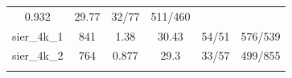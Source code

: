 \documentclass[]{article}
\begin{document}
\begin{longtable}[]{@{}cccccc@{}}
\begin{minipage}[t]{0.11\columnwidth}
0.932\strut
\end{minipage} & \begin{minipage}[t]{0.13\columnwidth}\centering\strut
29.77\strut
\end{minipage} & \begin{minipage}[t]{0.18\columnwidth}\centering\strut
32/77\strut
\end{minipage} & \begin{minipage}[t]{0.22\columnwidth}\centering\strut
511/460\strut
\end{minipage}\tabularnewline
\begin{minipage}[t]{0.11\columnwidth}\centering\strut
sier\_4k\_1\strut
\end{minipage} & \begin{minipage}[t]{0.07\columnwidth}\centering\strut
841\strut
\end{minipage} & \begin{minipage}[t]{0.11\columnwidth}\centering\strut
1.38\strut
\end{minipage} & \begin{minipage}[t]{0.13\columnwidth}\centering\strut
30.43\strut
\end{minipage} & \begin{minipage}[t]{0.18\columnwidth}\centering\strut
54/51\strut
\end{minipage} & \begin{minipage}[t]{0.22\columnwidth}\centering\strut
576/539\strut
\end{minipage}\tabularnewline
\begin{minipage}[t]{0.11\columnwidth}\centering\strut
sier\_4k\_2\strut
\end{minipage} & \begin{minipage}[t]{0.07\columnwidth}\centering\strut
764\strut
\end{minipage} & \begin{minipage}[t]{0.11\columnwidth}\centering\strut
0.877\strut
\end{minipage} & \begin{minipage}[t]{0.13\columnwidth}\centering\strut
29.3\strut
\end{minipage} & \begin{minipage}[t]{0.18\columnwidth}\centering\strut
33/57\strut
\end{minipage} & \begin{minipage}[t]{0.22\columnwidth}\centering\strut
499/855\strut
\end{minipage}\tabularnewline
\begin{minipage}[t]{0.11\columnwidth}\centering\strut

\end{minipage}
\end{longtable}
\end{document}
